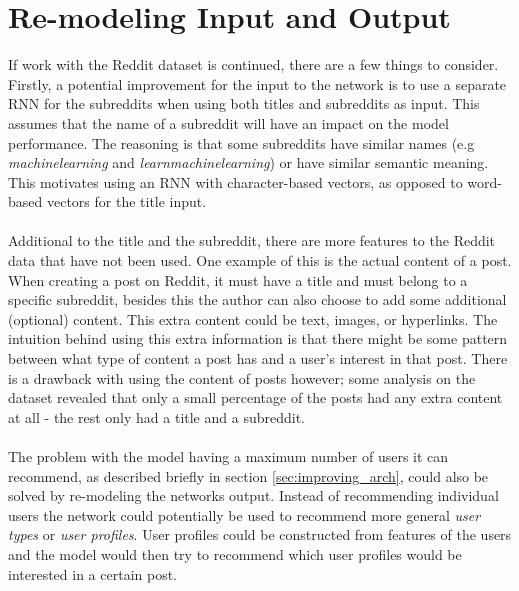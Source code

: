 \section{Re-modeling Input and Output}
If work with the Reddit dataset is continued, there are a few things to consider. Firstly, a potential improvement for the input to the network is to use a separate RNN for the subreddits when using both titles and subreddits as input. This assumes that the name of a subreddit will have an impact on the model performance. The reasoning is that some subreddits have similar names (e.g \textit{machinelearning} and \textit{learnmachinelearning}) or have similar semantic meaning. This motivates using an RNN with character-based vectors, as opposed to word-based vectors for the title input.
\\\\
Additional to the title and the subreddit, there are more features to the Reddit data that have not been used. One example of this is the actual content of a post. When creating a post on Reddit, it must have a title and must belong to a specific subreddit, besides this the author can also choose to add some additional (optional) content. This extra content could be text, images, or hyperlinks. The intuition behind using this extra information is that there might be some pattern between what type of content a post has and a user's interest in that post. There is a drawback with using the content of posts however; some analysis on the dataset revealed that only a small percentage of the posts had any extra content at all - the rest only had a title and a subreddit.
\\\\
The problem with the model having a maximum number of users it can recommend, as described briefly in section \ref{sec:improving_arch}, could also be solved by re-modeling the networks output. Instead of recommending individual users the network could potentially be used to recommend more general \textit{user types} or \textit{user profiles}. User profiles could be constructed from features of the users and the model would then try to recommend which user profiles would be interested in a certain post. 